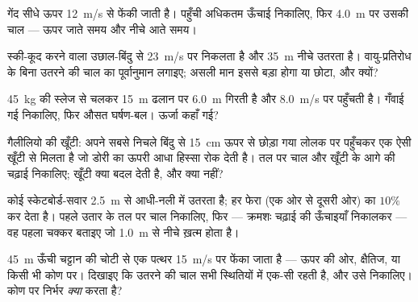 \begin{exercise}[$\star\star$]\label{exo:g11:mechanical-energy:8}
गेंद सीधे ऊपर \qty{12}{m/s} से फेंकी जाती है। पहुँची अधिकतम ऊँचाई निकालिए, फिर
\qty{4.0}{m} पर उसकी चाल --- ऊपर जाते समय और नीचे आते समय।
\end{exercise}

\begin{exercise}[$\star\star$]\label{exo:g11:mechanical-energy:9}
स्की-कूद करने वाला उछाल-बिंदु से \qty{23}{m/s} पर निकलता है और \qty{35}{m} नीचे उतरता
है। वायु-प्रतिरोध के बिना उतरने की चाल का पूर्वानुमान लगाइए; असली मान इससे
बड़ा होगा या छोटा, और क्यों?
\end{exercise}

\begin{exercise}[$\star\star$]\label{exo:g11:mechanical-energy:10}
\qty{45}{kg} की स्लेज  से चलकर \qty{15}{m} ढलान पर \qty{6.0}{m} गिरती है और \qty{8.0}{m/s}
पर पहुँचती है। गँवाई गई  निकालिए, फिर औसत
घर्षण-बल। ऊर्जा कहाँ गई?
\end{exercise}

\begin{exercise}[$\star\star$]\label{exo:g11:mechanical-energy:11}
गैलीलियो की खूँटी: अपने सबसे निचले बिंदु से \qty{15}{cm} ऊपर से छोड़ा गया लोलक
 पर पहुँचकर एक ऐसी खूँटी से मिलता है जो डोरी का ऊपरी आधा हिस्सा रोक
देती है। तल पर चाल और खूँटी के आगे की चढ़ाई निकालिए; खूँटी क्या बदल देती है,
और क्या नहीं?
\end{exercise}

\begin{exercise}[$\star\star\star$]\label{exo:g11:mechanical-energy:12}
कोई स्केटबोर्ड-सवार \qty{2.5}{m} से आधी-नली में उतरता है; हर फेरा (एक ओर
से दूसरी ओर)  का $10\%$  कर देता है। पहले उतार
के तल पर चाल निकालिए, फिर --- क्रमशः चढ़ाई की ऊँचाइयाँ निकालकर --- वह पहला
चक्कर बताइए जो \qty{1.0}{m} से नीचे ख़त्म होता है।
\end{exercise}

\begin{exercise}[$\star\star\star$]\label{exo:g11:mechanical-energy:13}
\qty{45}{m} ऊँची चट्टान की चोटी से एक पत्थर \qty{15}{m/s} पर फेंका जाता है --- ऊपर की
ओर, क्षैतिज, या किसी भी कोण पर। दिखाइए कि उतरने की चाल सभी स्थितियों में
एक-सी रहती है, और उसे निकालिए। कोण पर निर्भर \emph{क्या} करता है?
\end{exercise}

